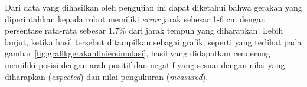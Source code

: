 

Dari data yang dihasilkan oleh pengujian ini dapat diketahui bahwa gerakan yang diperintahkan kepada robot memiliki \emph{error} jarak sebesar 1-6 cm dengan persentase rata-rata sebesar 1.7\% dari jarak tempuh yang diharapkan.
Lebih lanjut, ketika hasil tersebut ditampilkan sebagai grafik,
  seperti yang terlihat pada gambar \ref{fig:grafikgerakanliniersimulasi},
  hasil yang didapatkan cenderung memiliki posisi dengan arah positif dan negatif yang sesuai dengan nilai yang diharapkan (\emph{expected}) dan nilai pengukuran (\emph{measured}).
